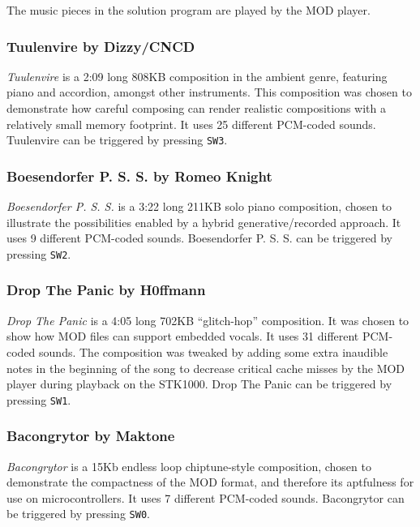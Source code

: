 The music pieces in the solution program are played by the MOD player.

\subsubsection{Tuulenvire by Dizzy/CNCD}
\emph{Tuulenvire} is a 2:09 long 808KB composition in the ambient genre, featuring piano and accordion, amongst other instruments.
This composition was chosen to demonstrate how careful composing can render realistic compositions with a relatively small memory footprint.
It uses 25 different PCM-coded sounds.
Tuulenvire can be triggered by pressing \texttt{SW3}.

\subsubsection{Boesendorfer P. S. S. by Romeo Knight}
\emph{Boesendorfer P. S. S.} is a 3:22 long 211KB solo piano composition, chosen to illustrate the possibilities enabled by a hybrid generative/recorded approach.
It uses 9 different PCM-coded sounds.
Boesendorfer P. S. S. can be triggered by pressing \texttt{SW2}.

\subsubsection{Drop The Panic by H0ffmann}
\emph{Drop The Panic} is a 4:05 long 702KB ``glitch-hop'' composition.
It was chosen to show how MOD files can support embedded vocals.
It uses 31 different PCM-coded sounds.
The composition was tweaked by adding some extra inaudible notes in the beginning of the song to decrease critical cache misses by the MOD player during playback on the STK1000.
Drop The Panic can be triggered by pressing \texttt{SW1}.

\subsubsection{Bacongrytor by Maktone}
\emph{Bacongrytor} is a 15Kb endless loop chiptune-style composition, chosen to demonstrate the compactness of the MOD format, and therefore its aptfulness for use on microcontrollers.
It uses 7 different PCM-coded sounds.
Bacongrytor can be triggered by pressing \texttt{SW0}.
